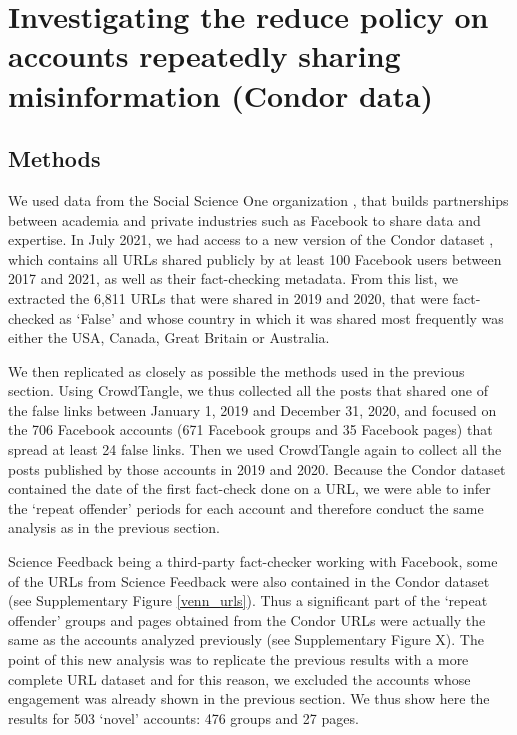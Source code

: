 \documentclass[review]{elsarticle}
\begin{document}
\section{Investigating the reduce policy on accounts repeatedly sharing misinformation (Condor data)}

\subsection{Methods}

We used data from the Social Science One organization \cite{king2020new}, that builds partnerships between academia and private industries such as Facebook to share data and expertise. 
In July 2021, we had access to a new version of the Condor dataset \cite{messing2020facebook}, which contains all URLs shared publicly by at least 100 Facebook users between 2017 and 2021, as well as their fact-checking metadata. 
From this list, we extracted the 6,811 URLs that were shared in 2019 and 2020, that were fact-checked as `False' and whose country in which it was shared most frequently was either the USA, Canada, Great Britain or Australia.

We then replicated as closely as possible the methods used in the previous section. 
Using CrowdTangle, we thus collected all the posts that shared one of the false links between January 1, 2019 and December 31, 2020, and focused on the 706 Facebook accounts (671 Facebook groups and 35 Facebook pages) that spread at least 24 false links. 
Then we used CrowdTangle again to collect all the posts published by those accounts in 2019 and 2020. 
Because the Condor dataset contained the date of the first fact-check done on a URL, we were able to infer the `repeat offender' periods for each account and therefore conduct the same analysis as in the previous section.

Science Feedback being a third-party fact-checker working with Facebook, some of the URLs from Science Feedback were also contained in the Condor dataset (see Supplementary Figure \ref{venn_urls}). 
Thus a significant part of the `repeat offender' groups and pages obtained from the Condor URLs were actually the same as the accounts analyzed previously ({\color{red}see Supplementary Figure X}). 
The point of this new analysis was to replicate the previous results with a more complete URL dataset and for this reason, we excluded the accounts whose engagement was already shown in the previous section. 
We thus show here the results for 503 `novel' accounts: 476 groups and 27 pages.
\end{document}
